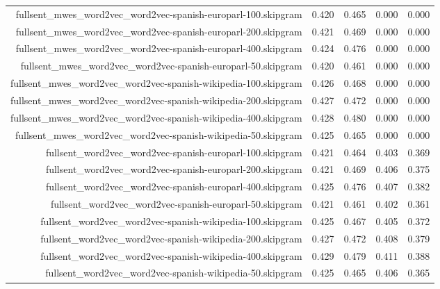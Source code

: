 \begin{figure*}
\begin{centering}
\begin{tabulary}{\textwidth}{|R|L|L|L|L|}
fullsent_mwes_word2vec_word2vec-spanish-europarl-100.skipgram & 0.420 & 0.465 & 0.000 & 0.000 \\
fullsent_mwes_word2vec_word2vec-spanish-europarl-200.skipgram & 0.421 & 0.469 & 0.000 & 0.000 \\
fullsent_mwes_word2vec_word2vec-spanish-europarl-400.skipgram & 0.424 & 0.476 & 0.000 & 0.000 \\
fullsent_mwes_word2vec_word2vec-spanish-europarl-50.skipgram & 0.420 & 0.461 & 0.000 & 0.000 \\
fullsent_mwes_word2vec_word2vec-spanish-wikipedia-100.skipgram & 0.426 & 0.468 & 0.000 & 0.000 \\
fullsent_mwes_word2vec_word2vec-spanish-wikipedia-200.skipgram & 0.427 & 0.472 & 0.000 & 0.000 \\
fullsent_mwes_word2vec_word2vec-spanish-wikipedia-400.skipgram & 0.428 & 0.480 & 0.000 & 0.000 \\
fullsent_mwes_word2vec_word2vec-spanish-wikipedia-50.skipgram & 0.425 & 0.465 & 0.000 & 0.000 \\
fullsent_word2vec_word2vec-spanish-europarl-100.skipgram & 0.421 & 0.464 & 0.403 & 0.369 \\
fullsent_word2vec_word2vec-spanish-europarl-200.skipgram & 0.421 & 0.469 & 0.406 & 0.375 \\
fullsent_word2vec_word2vec-spanish-europarl-400.skipgram & 0.425 & 0.476 & 0.407 & 0.382 \\
fullsent_word2vec_word2vec-spanish-europarl-50.skipgram & 0.421 & 0.461 & 0.402 & 0.361 \\
fullsent_word2vec_word2vec-spanish-wikipedia-100.skipgram & 0.425 & 0.467 & 0.405 & 0.372 \\
fullsent_word2vec_word2vec-spanish-wikipedia-200.skipgram & 0.427 & 0.472 & 0.408 & 0.379 \\
fullsent_word2vec_word2vec-spanish-wikipedia-400.skipgram & 0.429 & 0.479 & 0.411 & 0.388 \\
fullsent_word2vec_word2vec-spanish-wikipedia-50.skipgram & 0.425 & 0.465 & 0.406 & 0.365 \\
    \hline
    \hline


\end{tabulary}
\end{centering}
\end{figure*}
